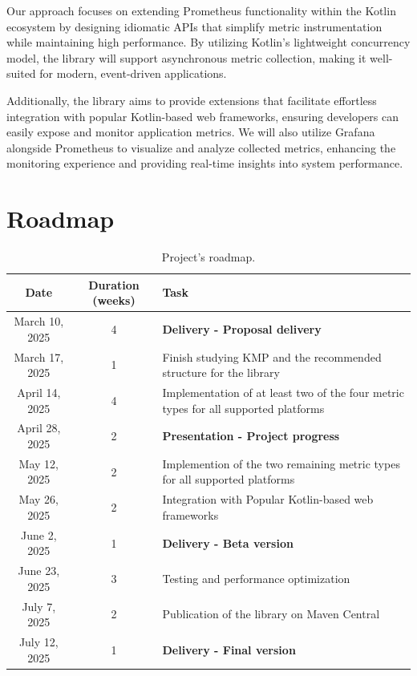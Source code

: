 \documentclass[a4paper,twoside,11pt]{article}
\begin{document}
Our approach focuses on extending Prometheus functionality within the Kotlin ecosystem by designing idiomatic APIs that simplify metric instrumentation while maintaining high performance. By utilizing Kotlin’s lightweight concurrency model, the library will support asynchronous metric collection, making it well-suited for modern, event-driven applications.

Additionally, the library aims to provide extensions that facilitate effortless integration with popular Kotlin-based web frameworks, ensuring developers can easily expose and monitor application metrics. We will also utilize Grafana alongside Prometheus to visualize and analyze collected metrics, enhancing the monitoring experience and providing real-time insights into system performance.

\section{Roadmap}
\begin{table}[h!]
\centering
\renewcommand{\arraystretch}{1.3}
\begin{tabular}{ |c|c|m{10cm}|  }
  \hline
  \textbf{Date} &\textbf{Duration (weeks)} &\textbf{Task}\\
  \hline
  March 10, 2025   & 4 & \textbf{Delivery - Proposal delivery}\\
  \hline
  March 17, 2025  & 1 & Finish studying KMP and the recommended structure for the library \\
  \hline
  April 14, 2025  & 4 &Implementation of at least two of the four metric types for all supported platforms\\
  \hline
  April 28, 2025 & 2 &   \textbf{Presentation - Project progress}\\
  \hline
  May 12, 2025 & 2 &   Implemention of the two remaining metric types for all supported platforms\\
  \hline
  May 26, 2025 & 2 &   Integration with Popular Kotlin-based web frameworks\\
  \hline
  June 2, 2025 & 1 &\textbf{Delivery - Beta version}\\
  \hline
  June 23, 2025 & 3 &Testing and performance optimization\\
  \hline
  July 7, 2025 & 2 &Publication of the library on Maven Central\\
  \hline
  July 12, 2025    & 1 &\textbf{Delivery - Final version}\\
  \hline
 \end{tabular}
 \caption{Project's roadmap.}
 \label{table:2}
\end{table}



\end{document}
